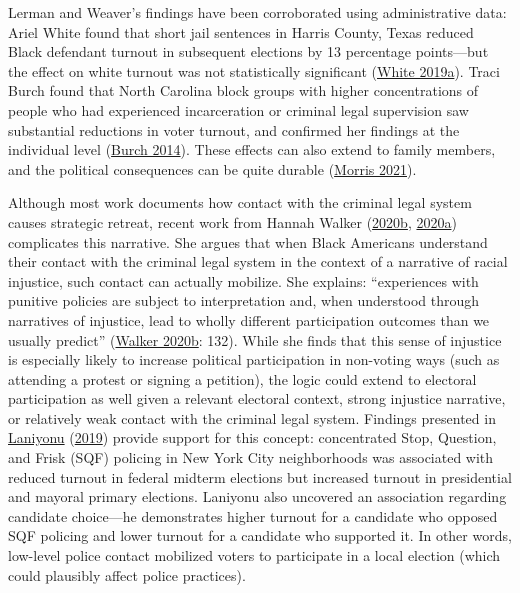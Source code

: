 \documentclass[
  12pt,
]{article}
\begin{document}
Lerman and Weaver's findings have been corroborated using administrative data: Ariel White found that short jail sentences in Harris County, Texas reduced Black defendant turnout in subsequent elections by 13 percentage points---but the effect on white turnout was not statistically significant (\protect\hyperlink{ref-White2019}{White 2019a}). Traci Burch found that North Carolina block groups with higher concentrations of people who had experienced incarceration or criminal legal supervision saw substantial reductions in voter turnout, and confirmed her findings at the individual level (\protect\hyperlink{ref-Burch2014}{Burch 2014}). These effects can also extend to family members, and the political consequences can be quite durable (\protect\hyperlink{ref-Morris2021}{Morris 2021}).

Although most work documents how contact with the criminal legal system causes strategic retreat, recent work from Hannah Walker (\protect\hyperlink{ref-Walker2020}{2020b}, \protect\hyperlink{ref-Walker2020a}{2020a}) complicates this narrative. She argues that when Black Americans understand their contact with the criminal legal system in the context of a narrative of racial injustice, such contact can actually mobilize. She explains: ``experiences with punitive policies are subject to interpretation and, when understood through narratives of injustice, lead to wholly different participation outcomes than we usually predict'' (\protect\hyperlink{ref-Walker2020}{Walker 2020b}: 132). While she finds that this sense of injustice is especially likely to increase political participation in non-voting ways (such as attending a protest or signing a petition), the logic could extend to electoral participation as well given a relevant electoral context, strong injustice narrative, or relatively weak contact with the criminal legal system. Findings presented in \protect\hyperlink{ref-Laniyonu2019}{Laniyonu} (\protect\hyperlink{ref-Laniyonu2019}{2019}) provide support for this concept: concentrated Stop, Question, and Frisk (SQF) policing in New York City neighborhoods was associated with reduced turnout in federal midterm elections but increased turnout in presidential and mayoral primary elections. Laniyonu also uncovered an association regarding candidate choice---he demonstrates higher turnout for a candidate who opposed SQF policing and lower turnout for a candidate who supported it. In other words, low-level police contact mobilized voters to participate in a local election (which could plausibly affect police practices).
\end{document}
